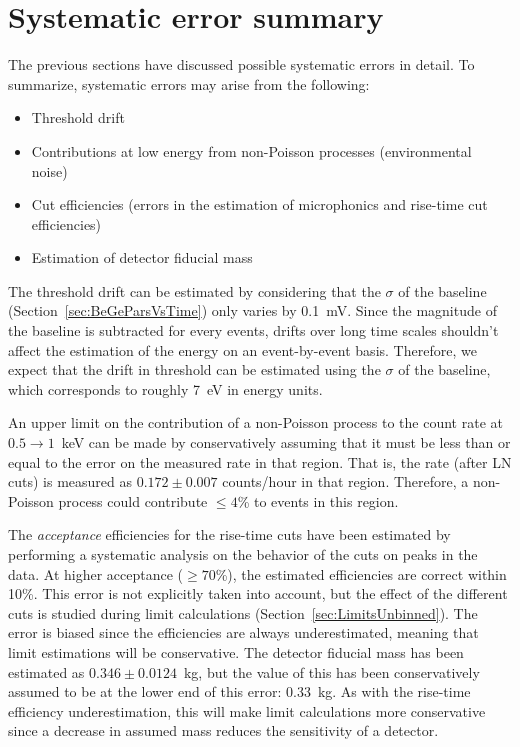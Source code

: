 
	\section{Systematic error summary}
	\label{sec:BeGeSysError}
	
	The previous sections have discussed possible systematic errors in detail.  To summarize, systematic errors may arise from the following:
		\begin{itemize}
			\item Threshold drift 
			\item Contributions at low energy from non-Poisson processes (environmental noise)			
			\item Cut efficiencies (errors in the estimation of microphonics and rise-time cut efficiencies)
			\item Estimation of detector fiducial mass
		\end{itemize}
		
	The threshold drift can be estimated by considering that the $\sigma$ of the baseline (Section~\ref{sec:BeGeParsVsTime}) only varies by 0.1~mV.  Since the magnitude of the baseline is subtracted for every events, drifts over long time scales shouldn't affect the estimation of the energy on an event-by-event basis.  Therefore, we expect that the drift in threshold can be estimated using the $\sigma$ of the baseline, which corresponds to roughly 7~eV in energy units.  
	
	An upper limit on the contribution of a non-Poisson process to the count rate at $0.5\to1$~keV can be made by conservatively assuming that it must be less than or equal to the error on the measured rate in that region.  That is, the rate (after LN cuts) is measured as $0.172\pm0.007$ counts/hour in that region.  Therefore, a non-Poisson process could contribute $\leq4$\% to events in this region.  	
	
	The \emph{acceptance} efficiencies for the rise-time cuts have been estimated by performing a systematic analysis on the behavior of the cuts on peaks in the data.  At higher acceptance ($\geq70$\%), the estimated efficiencies are correct within 10\%.  This error is not explicitly taken into account, but the effect of the different cuts is studied during limit calculations (Section~\ref{sec:LimitsUnbinned}).  The error is biased since the efficiencies are always underestimated, meaning that limit estimations will be conservative.  The detector fiducial mass has been estimated as $0.346\pm0.0124$~kg, but the value of this has been conservatively assumed to be at the lower end of this error: 0.33~kg.  As with the rise-time efficiency underestimation, this will make limit calculations more conservative since a decrease in assumed mass reduces the sensitivity of a detector.  
	
